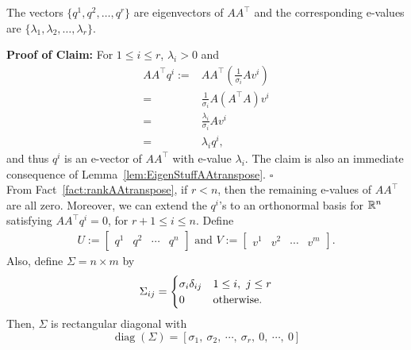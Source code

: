 \begin{claim} The vectors $\{ q^1, q^2, \ldots, q^r\}$ are eigenvectors of $A A^\top$ and the corresponding e-values are $\{ \lambda_1, \lambda_2, \ldots, \lambda_r\}$.
    \end{claim}
    \textbf{Proof of Claim:} For $1 \le i \le r$, $\lambda_i >0$ and 
    \begin{align*}
       A A^\top q^i :=& A A^\top \left(\frac{1}{\sigma_i}Av^i \right) \\
       =&  \frac{1}{\sigma_i} A \left(A^\top A \right) v^i \\
       =&   \frac{\lambda_i}{\sigma_i} A v^i \\
       =& \lambda_i q^i,
    \end{align*}
    and thus $q^i$ is an e-vector of $A A^\top$ with e-value $\lambda_i$. The claim is also an immediate consequence of Lemma~\ref{lem:EigenStuffAAtranspose}.
\hfill $\square$\\

From Fact~\ref{fact:rankAAtranspose}, if $r<n$, then the remaining e-values of  $A A^\top$ are all zero. Moreover, we can extend the $q^i$'s to an orthonormal basis for $\mathbb R^n$ satisfying $A A^\top q^i =0$, for $r+1 \le i \le n$. Define
    \begin{align*}
    U:=\begin{bmatrix}q^1 & q^2 & \cdots & q^n \end{bmatrix} \text{ and } 
       V:=\begin{bmatrix}v^1 & v^2 & \cdots & v^m \end{bmatrix}. 
    \end{align*}
Also, define $\Sigma=n\times m$ by
    \begin{equation*}
        \Sigma_{ij} = \begin{cases}
                \sigma_i\delta_{ij} & 1\leq i,\ j\leq r\\
                0 & \textnormal{otherwise}.
            \end{cases}
    \end{equation*}
Then, $\Sigma$ is rectangular diagonal with
    \begin{equation*}
        \operatorname{diag}\left(\Sigma\right)=[\sigma_1,\ \sigma_2,\ \cdots,\ \sigma_r,\ 0,\ \cdots,\ 0]
    \end{equation*}

